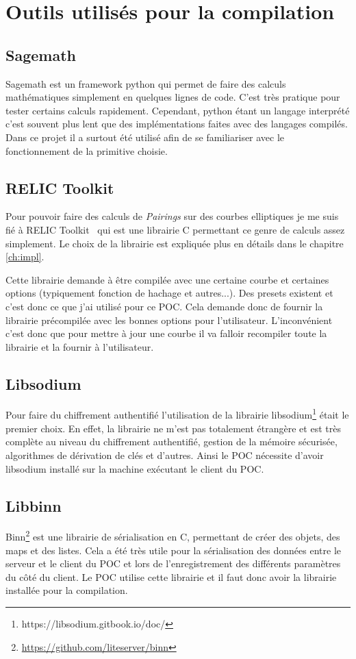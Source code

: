 \chapter{Outils utilisés pour la compilation}
\label{ch:outils}
\section{Sagemath}
Sagemath est un framework python qui permet de faire des calculs mathématiques simplement en quelques lignes de code. C'est très pratique pour tester certains calculs rapidement. Cependant, python étant un langage interprété c'est souvent plus lent que des implémentations faites avec des langages compilés. Dans ce projet il a surtout été utilisé afin de se familiariser avec le fonctionnement de la primitive choisie.

\section{RELIC Toolkit}
Pour pouvoir faire des calculs de \textit{Pairings} sur des courbes elliptiques je me suis fié à RELIC Toolkit~\cite{relic-toolkit} qui est une librairie C permettant ce genre de calculs assez simplement. Le choix de la librairie est expliquée plus en détails dans le chapitre \ref{ch:impl}.

Cette librairie demande à être compilée avec une certaine courbe et certaines options (typiquement fonction de hachage et autres...). Des presets existent et c'est donc ce que j'ai utilisé pour ce POC. Cela demande donc de fournir la librairie précompilée avec les bonnes options pour l'utilisateur. L'inconvénient c'est donc que pour mettre à jour une courbe il va falloir recompiler toute la librairie et la fournir à l'utilisateur.
\section{Libsodium}
Pour faire du chiffrement authentifié l'utilisation de la librairie  libsodium\footnote{https://libsodium.gitbook.io/doc/} était le premier choix. En effet, la librairie ne m'est pas totalement étrangère et est très complète au niveau du chiffrement authentifié, gestion de la mémoire sécurisée, algorithmes de dérivation de clés et d'autres. Ainsi le POC nécessite d'avoir libsodium installé sur la machine exécutant le client du POC.
\section{Libbinn}
Binn\footnote{\url{https://github.com/liteserver/binn}} est une librairie de sérialisation en C, permettant de créer des objets, des maps et des listes. Cela a été très utile pour la sérialisation des données entre le serveur et le client du POC et lors de l'enregistrement des différents paramètres du côté du client. Le POC utilise cette librairie et il faut donc avoir la librairie installée pour la compilation.
